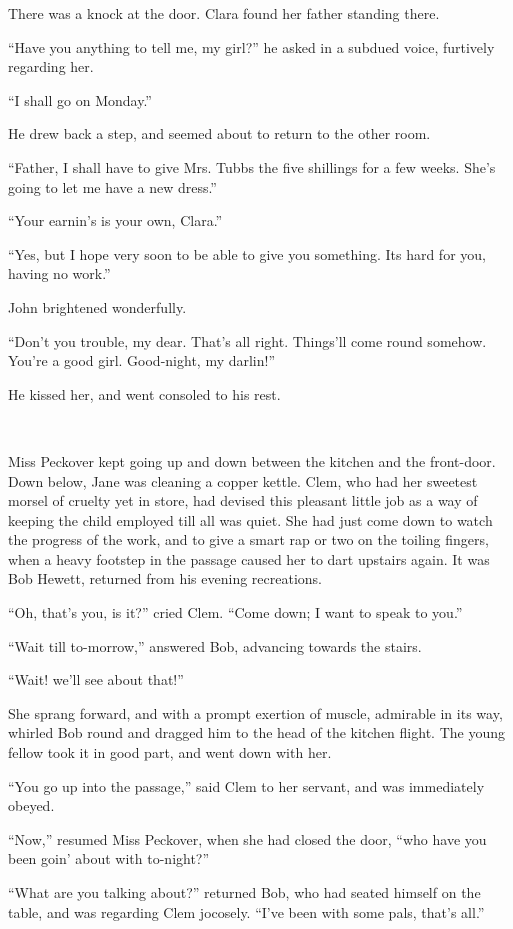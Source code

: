 There was a knock at the door. Clara found her father standing there.

``Have you anything to tell me, my girl?'' he asked in a subdued voice,
furtively regarding her.

``I shall go on Monday.''

He drew back a step, and seemed about to return to the other room.

``Father, I shall have to give Mrs. Tubbs the five shillings for a few
weeks. She's going to let me have a new dress.''

``Your earnin's is your own, Clara.''

``Yes, but I hope very soon to be able to give you something. Its hard
for you, having no work.''

John brightened wonderfully.

{}``Don't you trouble, my dear. That's all right. Things'll come round
somehow. You're a good girl. Good-night, my darlin!''

He kissed her, and went consoled to his rest.

~

Miss Peckover kept going up and down between the kitchen and the
front-door. Down below, Jane was cleaning a copper kettle. Clem, who had
her sweetest morsel of cruelty yet in store, had devised this pleasant
little job as a way of keeping the child employed till all was quiet.
She had just come down to watch the progress of the work, and to give a
smart rap or two on the toiling fingers, when a heavy footstep in the
passage caused her to dart upstairs again. It was Bob Hewett, returned
from his evening recreations.

``Oh, that's you, is it?'' cried Clem. ``Come down; I want to speak to
you.''

``Wait till to-morrow,'' answered Bob, advancing towards the stairs.

``Wait! we'll see about that!''

She sprang forward, and with a prompt {}exertion of muscle, admirable in
its way, whirled Bob round and dragged him to the head of the kitchen
flight. The young fellow took it in good part, and went down with her.

``You go up into the passage,'' said Clem to her servant, and was
immediately obeyed.

``Now,'' resumed Miss Peckover, when she had closed the door, ``who have
you been goin' about with to-night?''

``What are you talking about?'' returned Bob, who had seated himself on
the table, and was regarding Clem jocosely. ``I've been with some pals,
that's all.''

